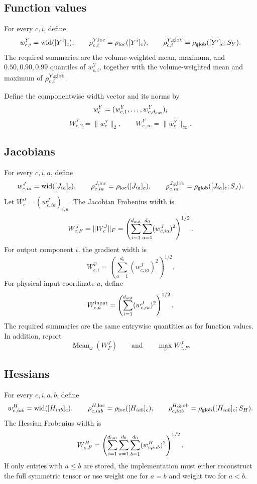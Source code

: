 \documentclass[11pt]{article}
\newcommand{\wid}{\operatorname{wid}}
\newcommand{\Mean}{\operatorname{Mean}}
\begin{document}
\subsection{Function values}

For every \(c,i\), define
\[
 w^Y_{c,i}=\wid([Y^i]_c),\qquad
 \rho_{c,i}^{Y,{\rm loc}}=\rho_{\rm loc}([Y^i]_c),\qquad
 \rho_{c,i}^{Y,{\rm glob}}=\rho_{\rm glob}([Y^i]_c;S_Y).
\]
The required summaries are the volume-weighted mean, maximum, and
\(0.50,0.90,0.99\) quantiles of \(w^Y_{c,i}\), together with the
volume-weighted mean and maximum of \(\rho_{c,i}^{Y,{\rm glob}}\).

Define the componentwise width vector and its norms by
\[
 w_c^Y=(w^Y_{c,1},\ldots,w^Y_{c,d_{\rm out}}),
\]
\[
 W_{c,2}^Y=\|w_c^Y\|_2,\qquad
 W_{c,\infty}^Y=\|w_c^Y\|_\infty.
\]

\subsection{Jacobians}

For every \(c,i,a\), define
\[
 w^J_{c,ia}=\wid([J_{ia}]_c),\qquad
 \rho_{c,ia}^{J,{\rm loc}}=\rho_{\rm loc}([J_{ia}]_c),\qquad
 \rho_{c,ia}^{J,{\rm glob}}=\rho_{\rm glob}([J_{ia}]_c;S_J).
\]
Let \(W_c^J=(w^J_{c,ia})_{i,a}\).  The Jacobian Frobenius width is
\[
 W_{c,F}^J=\|W_c^J\|_F
 =\left(\sum_{i=1}^{d_{\rm out}}\sum_{a=1}^{d_0}
 (w^J_{c,ia})^2\right)^{1/2}.
\]
For output component \(i\), the gradient width is
\[
 W_{c,i}^{\nabla}
 =\left(\sum_{a=1}^{d_0}(w^J_{c,ia})^2\right)^{1/2}.
\]
For physical-input coordinate \(a\), define
\[
 W_{c,a}^{\rm input}
 =\left(\sum_{i=1}^{d_{\rm out}}(w^J_{c,ia})^2\right)^{1/2}.
\]
The required summaries are the same entrywise quantities as for function
values.  In addition, report
\[\Mean_\omega(W_F^J)\qquad\text{and}\qquad \max_c W_{c,F}^J.\]

\subsection{Hessians}

For every \(c,i,a,b\), define
\[
 w^H_{c,iab}=\wid([H_{iab}]_c),\qquad
 \rho_{c,iab}^{H,{\rm loc}}=\rho_{\rm loc}([H_{iab}]_c),\qquad
 \rho_{c,iab}^{H,{\rm glob}}=\rho_{\rm glob}([H_{iab}]_c;S_H).
\]
The Hessian Frobenius width is
\[
 W_{c,F}^H
 =\left(\sum_{i=1}^{d_{\rm out}}\sum_{a=1}^{d_0}
 \sum_{b=1}^{d_0}(w^H_{c,iab})^2\right)^{1/2}.
\]
If only entries with \(a\leq b\) are stored, the implementation must either
reconstruct the full symmetric tensor or use weight one for \(a=b\) and weight
two for \(a<b\).
\end{document}
